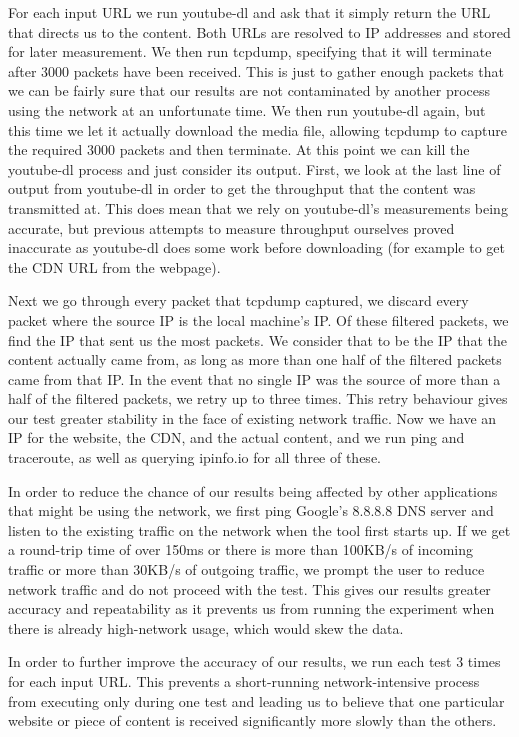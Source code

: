 \documentclass{sig-alternate-05-2015}
\begin{document}
For each input URL we run youtube-dl and ask that it simply return the URL that directs us to the content. Both URLs are resolved to IP addresses and stored for later measurement. We then run tcpdump, specifying that it will terminate after 3000 packets have been received. This is just to gather enough packets that we can be fairly sure that our results are not contaminated by another process using the network at an unfortunate time. We then run youtube-dl again, but this time we let it actually download the media file, allowing tcpdump to capture the required 3000 packets and then terminate. At this point we can kill the youtube-dl process and just consider its output. First, we look at the last line of output from youtube-dl in order to get the throughput that the content was transmitted at. This does mean that we rely on youtube-dl's measurements being accurate, but previous attempts to measure throughput ourselves proved inaccurate as youtube-dl does some work before downloading (for example to get the CDN URL from the webpage).

Next we go through every packet that tcpdump captured, we discard every packet where the source IP is the local machine's IP. Of these filtered packets, we find the IP that sent us the most packets. We consider that to be the IP that the content actually came from, as long as more than one half of the filtered packets came from that IP. In the event that no single IP was the source of more than a half of the filtered packets, we retry up to three times. This retry behaviour gives our test greater stability in the face of existing network traffic. Now we have an IP for the website, the CDN, and the actual content, and we run ping and traceroute, as well as querying ipinfo.io for all three of these.

In order to reduce the chance of our results being affected by other applications that might be using the network, we first ping Google's 8.8.8.8 DNS server and listen to the existing traffic on the network when the tool first starts up. If we get a round-trip time of over 150ms or there is more than 100KB/s of incoming traffic or more than 30KB/s of outgoing traffic, we prompt the user to reduce network traffic and do not proceed with the test. This gives our results greater accuracy and repeatability as it prevents us from running the experiment when there is already high-network usage, which would skew the data.

In order to further improve the accuracy of our results, we run each test 3 times for each input URL. This prevents a short-running network-intensive process from executing only during one test and leading us to believe that one particular website or piece of content is received significantly more slowly than the others.
\end{document}
